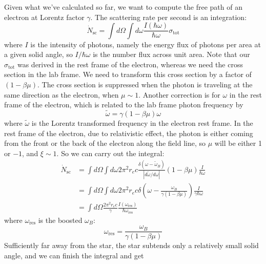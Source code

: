 \documentclass[letterpaper, 11pt]{article}
\numberwithin{equation}{section}
\numberwithin{figure}{section}
\begin{document}
Given what we've calculated so far, we want to compute the free path of an electron at Lorentz factor $\gamma$. The scattering rate per second is an integration:
\begin{equation}
    \label{eq:59}
    \dot{N}_\mathrm{sc} = \int d\Omega \int d\omega \frac{I(\hbar\omega)}{\hbar\omega}\sigma_\mathrm{tot}
\end{equation}
where $I$ is the intensity of photons, namely the energy flux of photons per area at a given solid angle, so $I/\hbar\omega$ is the number flux across unit area. Note that our $\sigma_\mathrm{tot}$ was derived in the rest frame of the electron, whereas we need the cross section in the lab frame. We need to transform this cross section by a factor of $(1 - \beta\mu)$. The cross section is suppressed when the photon is traveling at the same direction as the electron, when $\mu \sim 1$. Another correction is for $\omega$ in the rest frame of the electron, which is related to the lab frame photon frequency by
\begin{equation}
    \label{eq:57}
    \tilde{\omega} = \gamma(1 - \beta\mu)\omega
\end{equation}
where $\tilde{\omega}$ is the Lorentz transformed frequency in the electron rest frame. In the rest frame of the electron, due to relativistic effect, the photon is either coming from the front or the back of the electron along the field line, so $\mu$ will be either 1 or $-1$, and $\xi \sim 1$. So we can carry out the integral:
\begin{equation}
    \label{eq:60}
    \begin{split}
        \dot{N}_\mathrm{sc} &= \int d\Omega \int d\omega 2\pi^2 r_ec\frac{\delta(\omega - \tilde{\omega}_B)}{|d\tilde{\omega}/d\omega|}(1 - \beta\mu)\frac{I}{\hbar\omega} \\
        &= \int d\Omega \int d\omega 2\pi^2 r_ec \delta \left( \omega - \frac{\omega_B}{\gamma(1 - \beta\mu)} \right)\frac{I}{\gamma\hbar\omega} \\
        &= \int d\Omega \frac{2\pi^2 r_ec}{\gamma}\frac{I(\omega_\mathrm{res})}{\hbar\omega_\mathrm{res}}
    \end{split}
\end{equation}
where $\omega_\mathrm{res}$ is the boosted $\omega_B$:
\begin{equation}
    \label{eq:61}
    \omega_\mathrm{res} = \frac{\omega_B}{\gamma(1 - \beta\mu)}
\end{equation}
Sufficiently far away from the star, the star subtends only a relatively small solid angle, and we can finish the integral and get
\end{document}
